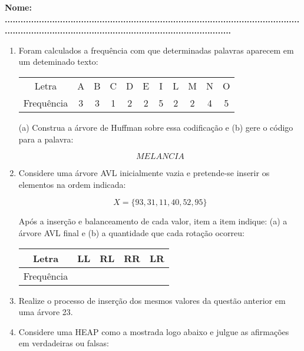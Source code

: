\documentclass[11pt]{article}
\begin{document}
\large \textbf{Nome: \tiny ......................................................................................................................................................................................................}
\begin{enumerate}[label=\textbf{Q\arabic*}]
    \item Foram calculados a frequência com que determinadas palavras aparecem em um deteminado texto:
          \begin{center}
              \begin{tabular}{c|cccccccccc}
                  \hline
                  Letra      & A & B & C & D & E & I & L & M & N & O \\
                  Frequência & 3 & 3 & 1 & 2 & 2 & 5 & 2 & 2 & 4 & 5 \\
                  \hline
              \end{tabular}
          \end{center}
          (a) Construa a árvore de Huffman sobre essa codificação e (b) gere o código para a palavra:

          $$MELANCIA$$

    \item Considere uma árvore AVL inicialmente vazia e pretende-se inserir os elementos na ordem indicada:\label{QAVL_1}

          $$X = \{93, 31, 11, 40, 52, 95\}$$

          Após a inserção e balanceamento de cada valor, item a item indique: (a) a árvore AVL final e (b) a quantidade que cada rotação ocorreu:

          \begin{center}
              \begin{tabular}{|c|c|c|c|c|}
                  \hline
                  Letra      & LL & RL & RR & LR \\
                  \hline
                  Frequência & \  & \  & \  & \  \\
                  \hline
              \end{tabular}
          \end{center}

    \item Realize o processo de inserção dos mesmos valores da questão anterior em uma árvore 23.

    \item Considere uma HEAP como a mostrada logo abaixo e julgue as afirmações em verdadeiras ou falsas:


\end{enumerate}
\end{document}
